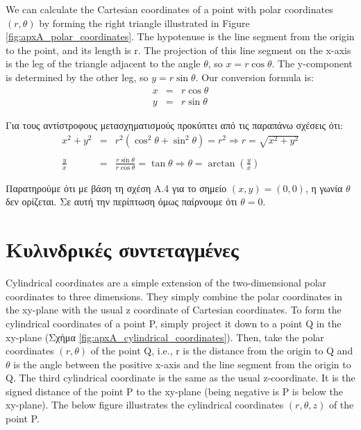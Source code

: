 We can calculate the Cartesian coordinates of a point with polar coordinates $(r, \theta)$ by forming the right triangle illustrated in Figure \ref{fig:apxA_polar_coordinates}.  The hypotenuse is the line segment from the origin to the point, and its length is r. The projection of this line segment on the x-axis is the leg of the triangle adjacent to the angle $\theta$, so $x=r \cos \theta$. The y-component is determined by the other leg, so $y = r \sin \theta$. Our conversion formula is:
\begin{eqnarray}
    x &=& r \cos \theta \\
    y &=& r \sin \theta 
\end{eqnarray}

Για τους αντίστροφους μετασχηματισμούς προκύπτει από τις παραπάνω σχέσεις ότι:
\begin{eqnarray}
    x^2 + y^2 &=& r^2 (\cos^2 \theta + \sin^2 \theta) = r^2 \Rightarrow r = \sqrt{x^2 + y^2} \\ \nonumber \\
    \frac{y}{x} &=& \frac{r \sin \theta}{r \cos \theta} = \tan \theta \Rightarrow \theta = \arctan \left( \frac{y}{x} \right)
\end{eqnarray}

Παρατηρούμε ότι με βάση τη σχέση Α.4 για το σημείο $(x,y) = (0,0)$, η γωνία $\theta$ δεν ορίζεται. Σε αυτή την περίπτωση όμως παίρνουμε ότι $\theta = 0$.


\section{Κυλινδρικές συντεταγμένες}
Cylindrical coordinates are a simple extension of the two-dimensional polar coordinates to three dimensions. They simply combine the polar coordinates in the xy-plane with the usual z coordinate of Cartesian coordinates. To form the cylindrical coordinates of a point P, simply project it down to a point Q in the xy-plane (Σχήμα \ref{fig:apxA_cylindrical_coordinates}). Then, take the polar coordinates $(r, \theta)$ of the point Q, i.e., r is the distance from the origin to Q and $\theta$ is the angle between the positive x-axis and the line segment from the origin to Q. The third cylindrical coordinate is the same as the usual z-coordinate. It is the signed distance of the point P to the xy-plane (being negative is P is below the xy-plane). The below figure illustrates the cylindrical coordinates $(r, \theta, z)$ of the point P.


